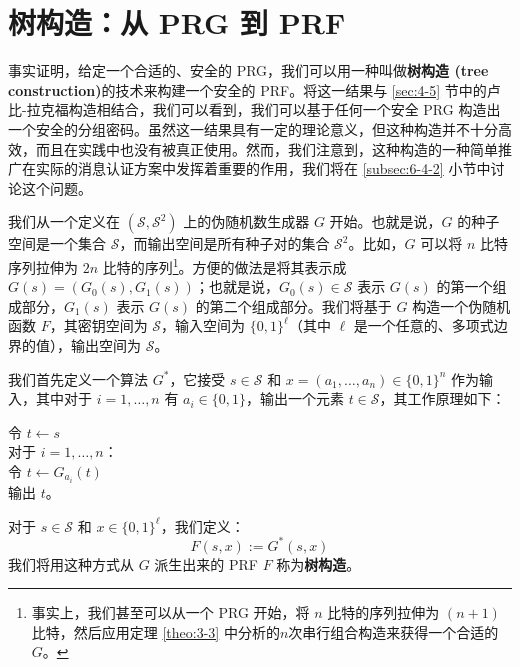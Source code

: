 \section{树构造：从 PRG 到 PRF}\label{sec:4-6}

事实证明，给定一个合适的、安全的 PRG，我们可以用一种叫做\textbf{树构造 (tree construction)}的技术来构建一个安全的 PRF。将这一结果与 \ref{sec:4-5} 节中的卢比-拉克福构造相结合，我们可以看到，我们可以基于任何一个安全 PRG 构造出一个安全的分组密码。虽然这一结果具有一定的理论意义，但这种构造并不十分高效，而且在实践中也没有被真正使用。然而，我们注意到，这种构造的一种简单推广在实际的消息认证方案中发挥着重要的作用，我们将在 \ref{subsec:6-4-2} 小节中讨论这个问题。

我们从一个定义在 $(\mathcal{S},\mathcal{S}^2)$ 上的伪随机数生成器 $G$ 开始。也就是说，$G$ 的种子空间是一个集合 $\mathcal{S}$，而输出空间是所有种子对的集合 $\mathcal{S}^2$。比如，$G$ 可以将 $n$ 比特序列拉伸为 $2n$ 比特的序列\footnote[2]{事实上，我们甚至可以从一个 PRG 开始，将 $n$ 比特的序列拉伸为 $(n+1)$ 比特，然后应用定理 \ref{theo:3-3} 中分析的$n$次串行组合构造来获得一个合适的 $G$。}。方便的做法是将其表示成$G(s) = (G_0(s),G_1(s))$；也就是说，$G_0(s)\in\mathcal{S}$ 表示 $G(s)$ 的第一个组成部分，$G_1(s)$ 表示 $G(s)$ 的第二个组成部分。我们将基于 $G$ 构造一个伪随机函数 $F$，其密钥空间为 $\mathcal{S}$，输入空间为 $\{0,1\}^\ell$（其中 $\ell$ 是一个任意的、多项式边界的值），输出空间为 $\mathcal{S}$。

我们首先定义一个算法 $G^*$，它接受 $s\in\mathcal{S}$ 和 $x=(a_1,\dots,a_n)\in\{0,1\}^n$ 作为输入，其中对于 $i=1,\dots,n$ 有 $a_i\in\{0,1\}$，输出一个元素 $t\in\mathcal{S}$，其工作原理如下：

\vspace{5pt}

\hspace*{5pt} 令 $t\leftarrow s$\\
\hspace*{26pt} 对于 $i=1,\dots,n$：\\
\hspace*{50pt} 令 $t\leftarrow G_{a_i}(t)$\\
\hspace*{26pt} 输出 $t$。

\vspace{5pt}

\noindent
对于 $s\in\mathcal{S}$ 和 $x\in\{0,1\}^\ell$，我们定义：
\[
F(s,x):=G^*(s,x)
\]
我们将用这种方式从 $G$ 派生出来的 PRF $F$ 称为\textbf{树构造}。


